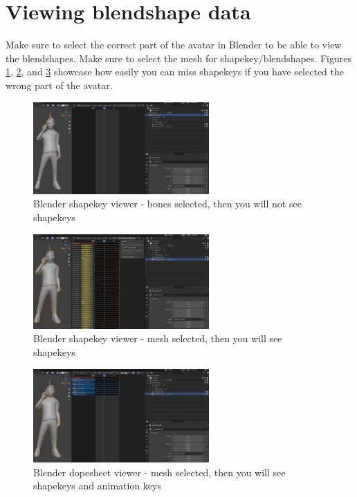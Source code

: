 \documentclass{uva-inf-article}
\begin{document}
\section{Viewing blendshape data}
Make sure to select the correct part of the avatar in Blender to be able to view the blendshapes. Make sure to select the mesh for shapekey/blendshapes. Figures \ref{fig:shapekeybones}, \ref{fig:shapekeysmesh}, and \ref{fig:dopesheetmesh} showcase how easily you can miss shapekeys if you have selected the wrong part of the avatar.
\begin{figure}[hbt!]
    \centering
    \includegraphics[width=0.6\textwidth]{imgs/viewingBlends/dopesheetnothingvisible.png}
    \caption{Blender shapekey viewer - bones selected, then you will not see shapekeys }
    \label{fig:shapekeybones}
\end{figure}
\begin{figure}[hbt!]
    \centering
    \includegraphics[width=0.6\textwidth]{imgs/viewingBlends/actionkeys.png}
    \caption{Blender shapekey viewer - mesh selected, then you will see shapekeys }
    \label{fig:shapekeysmesh}
\end{figure}
\begin{figure}[hbt!]
    \centering
    \includegraphics[width=0.6\textwidth]{imgs/viewingBlends/dopesheet.png}
    \caption{Blender dopesheet viewer - mesh selected, then you will see shapekeys and animation keys }
    \label{fig:dopesheetmesh}
\end{figure}
\end{document}

